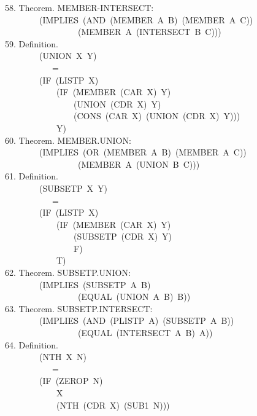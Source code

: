 \documentclass[10pt]{book}
\newenvironment{pubasis}{\begin{flushleft}}{\end{flushleft}}
\begin{document}
\begin{pubasis}
58.     Theorem.  MEMBER-INTERSECT:\\
~~~~~~~~(IMPLIES~(AND~(MEMBER~A~B)~(MEMBER~A~C))\\
~~~~~~~~~~~~~~~~~(MEMBER~A~(INTERSECT~B~C)))\\

59.     Definition.\\
~~~~~~~~(UNION~X~Y)\\
~~~~~~~~~~~=\\
~~~~~~~~(IF~(LISTP~X)\\
~~~~~~~~~~~~(IF~(MEMBER~(CAR~X)~Y)\\
~~~~~~~~~~~~~~~~(UNION~(CDR~X)~Y)\\
~~~~~~~~~~~~~~~~(CONS~(CAR~X)~(UNION~(CDR~X)~Y)))\\
~~~~~~~~~~~~Y)\\

60.     Theorem.  MEMBER.UNION:\\
~~~~~~~~(IMPLIES~(OR~(MEMBER~A~B)~(MEMBER~A~C))\\
~~~~~~~~~~~~~~~~~(MEMBER~A~(UNION~B~C)))\\

61.     Definition.\\
~~~~~~~~(SUBSETP~X~Y)\\
~~~~~~~~~~~=\\
~~~~~~~~(IF~(LISTP~X)\\
~~~~~~~~~~~~(IF~(MEMBER~(CAR~X)~Y)\\
~~~~~~~~~~~~~~~~(SUBSETP~(CDR~X)~Y)\\
~~~~~~~~~~~~~~~~F)\\
~~~~~~~~~~~~T)\\

62.     Theorem.  SUBSETP.UNION:\\
~~~~~~~~(IMPLIES~(SUBSETP~A~B)\\
~~~~~~~~~~~~~~~~~(EQUAL~(UNION~A~B)~B))\\

63.     Theorem.  SUBSETP.INTERSECT:\\
~~~~~~~~(IMPLIES~(AND~(PLISTP~A)~(SUBSETP~A~B))\\
~~~~~~~~~~~~~~~~~(EQUAL~(INTERSECT~A~B)~A))\\

64.     Definition.\\
~~~~~~~~(NTH~X~N)\\
~~~~~~~~~~~=\\
~~~~~~~~(IF~(ZEROP~N)\\
~~~~~~~~~~~~X\\
~~~~~~~~~~~~(NTH~(CDR~X)~(SUB1~N)))\\


\end{pubasis}
\end{document}
